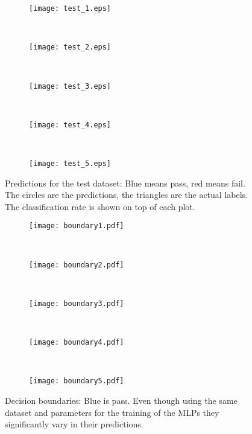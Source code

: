 \documentclass[a4paper,11pt]{article}
\theoremstyle{definition}
\theoremstyle{plain}
\theoremstyle{remark}
\begin{document}
\begin{figure}
\centering
\begin{subfigure}[b]{0.18\textwidth}
\centering
\texttt{[image: test\_1.eps]}
\caption{}
\end{subfigure}
~
\begin{subfigure}[b]{0.18\textwidth}
\centering
\texttt{[image: test\_2.eps]}
\caption{}
\end{subfigure}
~
\begin{subfigure}[b]{0.18\textwidth}
\centering
\texttt{[image: test\_3.eps]}
\caption{}
\end{subfigure}
~
\begin{subfigure}[b]{0.18\textwidth}
\centering
\texttt{[image: test\_4.eps]}
\caption{}
\end{subfigure}
~
\begin{subfigure}[b]{0.18\textwidth}
\centering
\texttt{[image: test\_5.eps]}
\caption{}
\end{subfigure}

\caption{Predictions for the test dataset: Blue means pass, red means fail. The circles are the predictions, the triangles are the actual labels. The classification rate is shown on top of each plot.}
\label{fig:4.2.1_test}
\end{figure}

\begin{figure}
\centering
\begin{subfigure}[b]{0.18\textwidth}
\centering
\texttt{[image: boundary1.pdf]}
\caption{}
\end{subfigure}
~
\begin{subfigure}[b]{0.18\textwidth}
\centering
\texttt{[image: boundary2.pdf]}
\caption{}
\end{subfigure}
~
\begin{subfigure}[b]{0.18\textwidth}
\centering
\texttt{[image: boundary3.pdf]}
\caption{}
\end{subfigure}
~
\begin{subfigure}[b]{0.18\textwidth}
\centering
\texttt{[image: boundary4.pdf]}
\caption{}
\end{subfigure}
~
\begin{subfigure}[b]{0.18\textwidth}
\centering
\texttt{[image: boundary5.pdf]}
\caption{}
\end{subfigure}

\caption{Decision boundaries: Blue is pass. Even though using the same dataset and parameters for the training of the MLPs they significantly vary in their predictions.}
\label{fig:4.2.1_bound}
\end{figure}
\end{document}
